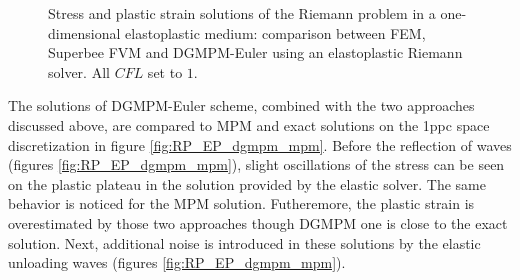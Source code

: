 \begin{figure}[h!]
  \centering
  { \label{subfig:ep_dgmpm_fvm1}}
  { \label{subfig:ep_dgmpm_fvm2}}
  { \label{subfig:ep_dgmpm_fvm3}}
  {}
  \caption{Stress and plastic strain solutions of the Riemann problem in a one-dimensional elastoplastic medium: comparison between FEM, Superbee FVM and DGMPM-Euler using an elastoplastic Riemann solver. All $CFL$ set to $1$.}
  \label{fig:RP_EP_dgmpm_fvm}
\end{figure}
The solutions of DGMPM-Euler scheme, combined with the two approaches discussed above, are compared to MPM and exact solutions on the 1ppc space discretization in figure \ref{fig:RP_EP_dgmpm_mpm}.
Before the reflection of waves (figures \ref{fig:RP_EP_dgmpm_mpm}), slight oscillations of the stress can be seen on the plastic plateau in the solution provided by the elastic solver. The same behavior is noticed for the MPM solution. Futheremore, the plastic strain is overestimated by those two approaches though DGMPM one is close to the exact solution. Next, additional noise is introduced in these solutions by the elastic unloading waves (figures \ref{fig:RP_EP_dgmpm_mpm}).


